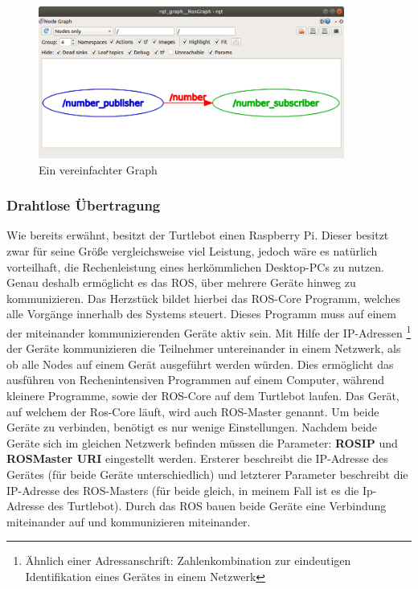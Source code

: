 {{{			\begin{figure}
				\centering
				\includegraphics[height=5cm]{Bilder/rqt_graph_simplified.png}
				\caption{Ein vereinfachter Graph \\
					\parencite{rqtgraphsimplified1}} 
				\label{pic:rqt_graph_simplified}
			\end{figure}
		}
		
		\subsubsection{Drahtlose Übertragung}
		{ Wie bereits erwähnt, besitzt der Turtlebot einen Raspberry Pi. Dieser besitzt zwar für seine Größe vergleichsweise viel Leistung, jedoch wäre es natürlich vorteilhaft, die Rechenleistung eines herkömmlichen Desktop-PCs zu nutzen. Genau deshalb ermöglicht es das ROS, über mehrere Geräte hinweg zu kommunizieren. Das Herzstück bildet hierbei das ROS-Core Programm, welches alle Vorgänge innerhalb des Systems steuert. Dieses Programm muss auf einem der miteinander kommunizierenden Geräte aktiv sein. Mit Hilfe der IP-Adressen \footnote{Ähnlich einer Adressanschrift: Zahlenkombination zur eindeutigen Identifikation eines Gerätes in einem Netzwerk} der Geräte kommunizieren die Teilnehmer untereinander in einem Netzwerk, als ob alle Nodes auf einem Gerät ausgeführt werden würden. Dies ermöglicht das ausführen von Rechenintensiven Programmen auf einem Computer, während kleinere Programme, sowie der ROS-Core auf dem Turtlebot laufen. Das Gerät, auf welchem der Ros-Core läuft, wird auch ROS-Master genannt. Um beide Geräte zu verbinden, benötigt es nur wenige Einstellungen. Nachdem beide Geräte sich im gleichen Netzwerk befinden müssen die Parameter: \textbf{ROS\textunderscore IP} und \textbf{ROS\textunderscore Master \textunderscore URI} eingestellt werden. Ersterer beschreibt die IP-Adresse des Gerätes (für beide Geräte unterschiedlich) und letzterer Parameter beschreibt die IP-Adresse des ROS-Masters (für beide gleich, in meinem Fall ist es die Ip-Adresse des Turtlebot). Durch das ROS bauen beide Geräte eine Verbindung miteinander auf und kommunizieren miteinander.
			
}}}
